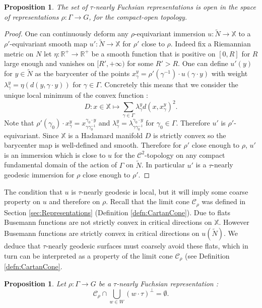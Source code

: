 \documentclass[reqno,10pt]{amsart}
\theoremstyle{plain}
\newtheorem{prop}[thm]{Proposition}
\theoremstyle{definition}
\theoremstyle{remark}
\newcommand{\type}{\tau}
\newcommand{\R}{\mathbb{R}}
\newcommand{\X}{\mathbb{X}}
\begin{document}
\begin{prop}
The set of $\type$-nearly Fuchsian representations is open in the space of representations $\rho:\Gamma\to G$, for the compact-open topology.
\end{prop}
\begin{proof}
One can continuously deform any $\rho$-equivariant immersion $u:\widetilde{N}\to \X$ to a $\rho'$-equivariant smooth map $u':\widetilde{N}\to \X$ for $\rho'$ close to $\rho$. Indeed fix a Riemannian metric on $N$ let $\eta:\R^+\to \R^+$ be a smooth function that is positive on $[0,R]$ for $R$ large enough and vanishes on $[R',+\infty)$ for some $R'>R$. One can define $u'(y)$ for $y\in \widetilde{N}$ as the barycenter of the points $x^y_\gamma=\rho'(\gamma^{-1})\cdot u(\gamma\cdot y)$ with weight $\lambda^y_\gamma=\eta(d(y,\gamma\cdot y))$ for $\gamma\in \Gamma$. Concretely this means that we consider the unique local minimum of the convex function :
$$D:x\in \X\mapsto \sum_{\gamma\in \Gamma}\lambda^y_\gamma d(x,x^y_\gamma)^2.$$
Note that $\rho'(\gamma_0)\cdot x_\gamma^y=x^{\gamma_0\cdot y}_{\gamma\gamma_0^{-1}}$ and $\lambda^y_\gamma=\lambda^{\gamma_0\cdot y}_{\gamma\gamma_0^{-1}}$ for $\gamma_0\in \Gamma$. Therefore $u'$ is $\rho'$-equivariant.
Since $\X$ is a Hadamard manifold $D$ is strictly convex so the barycenter map is well-defined and smooth. Therefore for $\rho'$ close enough to $\rho$, $u'$ is an immersion which is close to $u$ for the $\mathcal{C}^2$-topology on any compact fundamental domain of the action of $\Gamma$ on $\widetilde{N}$. In particular $u'$ is a $\type$-nearly geodesic immersion for $\rho$ close enough to $\rho'$.
\end{proof}

The condition that $u$ is $\type$-nearly geodesic is local, but it will imply some coarse property on $u$ and therefore on $\rho$. Recall that the limit cone $\mathcal{C}_\rho$ was defined in Section \ref{sec:Representations} (Definition \ref{defn:CartanCone}). Due to flats Busemann functions are not strictly convex in critical directions on $\X$. However Busemann functions are strictly convex in critical directions on $u(\widetilde{N})$. We deduce that $\type$-nearly geodesic surfaces must coarsely avoid these flats, which in turn can be interpreted as a property of the limit cone $\mathcal{C}_\rho$ (see Definition \ref{defn:CartanCone}.

\begin{prop}
\label{prop:CartanCone}
Let $\rho:\Gamma\to G$ be a $\type$-nearly Fuchsian representation :
\begin{equation}
\label{eq:CartanCone}
\mathcal{C}_\rho\cap \bigcup_{w\in W} (w\cdot \type)^\perp=\emptyset .\end{equation}
\end{prop}
\end{document}
